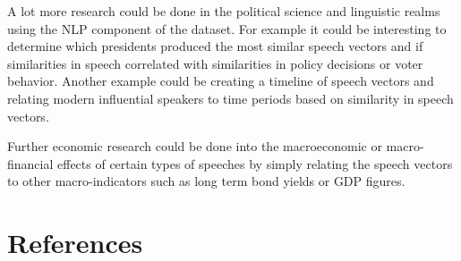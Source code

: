 \documentclass[11pt,preprint, authoryear]{elsarticle}
\numberwithin{equation}{section}
\numberwithin{figure}{section}
\numberwithin{table}{section}
\begin{document}
A lot more research could be done in the political science and
linguistic realms using the NLP component of the dataset. For example it
could be interesting to determine which presidents produced the most
similar speech vectors and if similarities in speech correlated with
similarities in policy decisions or voter behavior. Another example
could be creating a timeline of speech vectors and relating modern
influential speakers to time periods based on similarity in speech
vectors.

Further economic research could be done into the macroeconomic or
macro-financial effects of certain types of speeches by simply relating
the speech vectors to other macro-indicators such as long term bond
yields or GDP figures.

\newpage

\hypertarget{references}{%
\section*{References}\label{references}}
\end{document}
